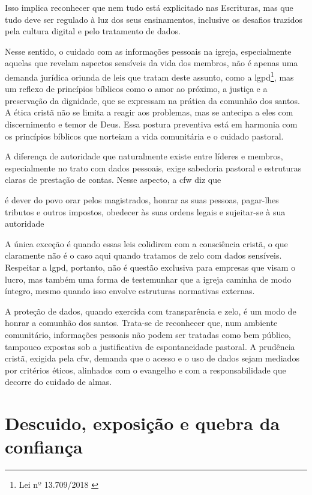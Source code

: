 Isso implica reconhecer que nem tudo está explicitado nas Escrituras, mas que tudo deve ser regulado à luz dos seus ensinamentos, inclusive os desafios trazidos pela cultura digital e pelo tratamento de dados.

Nesse sentido, o cuidado com as informações pessoais na igreja, especialmente aquelas que revelam aspectos sensíveis da vida dos membros, não é apenas uma demanda jurídica oriunda de leis que tratam deste assunto, como a \gls{lgpd}\footnote{Lei nº 13.709/2018 \cite{lgpd2018}}, mas um reflexo de princípios bíblicos como o amor ao próximo, a justiça e a preservação da dignidade, que se expressam na prática da comunhão dos santos. A ética cristã não se limita a reagir aos problemas, mas se antecipa a eles com discernimento e temor de Deus. Essa postura preventiva está em harmonia com os princípios bíblicos que norteiam a vida comunitária e o cuidado pastoral.

A diferença de autoridade que naturalmente existe entre líderes e membros, especialmente no trato com dados pessoais, exige sabedoria pastoral e estruturas claras de prestação de contas. Nesse aspecto, a \gls{cfw} diz que 

\begin{citacao}
    é dever do povo orar pelos magistrados, honrar as suas pessoas, pagar-lhes tributos e outros impostos, obedecer às suas ordens legais e sujeitar-se à sua autoridade \cite[Cap.~XXIII]{cfw}    
\end{citacao}

A única exceção é quando essas leis colidirem com a consciência cristã, o que claramente não é o caso aqui quando tratamos de zelo com dados sensíveis. Respeitar a \gls{lgpd}, portanto, não é questão exclusiva para empresas que visam o lucro, mas também uma forma de testemunhar que a igreja caminha de modo íntegro, mesmo quando isso envolve estruturas normativas externas.

A proteção de dados, quando exercida com transparência e zelo, é um modo de honrar a comunhão dos santos. Trata-se de reconhecer que, num ambiente comunitário, informações pessoais não podem ser tratadas como bem público, tampouco expostas sob a justificativa de espontaneidade pastoral. A prudência cristã, exigida pela \gls{cfw}, demanda que o acesso e o uso de dados sejam mediados por critérios éticos, alinhados com o evangelho e com a responsabilidade que decorre do cuidado de almas.

\section{Descuido, exposição e quebra da confiança}

